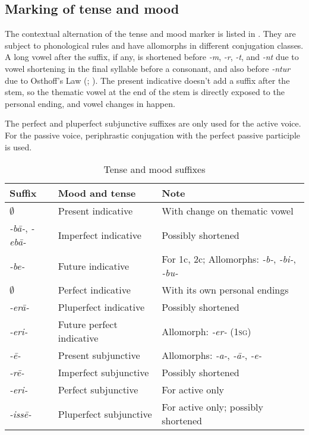 \documentclass[a4paper, oneside, 12pt]{report}
\newcommand*{\citepage}[1]{p.~{#1}}
\newcommand{\form}[1]{\emph{#1}}
\newcommand*{\category}[1]{\textsc{#1}}
\begin{document}
\subsection{Marking of tense and mood}\label{sec:tense-mood-marking}

The contextual alternation of the tense and mood marker is listed in
.
They are subject to phonological rules 
and have allomorphs in different conjugation classes. 
A long vowel after the suffix,
if any, is shortened before \form{-m}, \form{-r}, \form{-t}, and \form{-nt}
due to vowel shortening in the final syllable before a consonant,
and also before \form{-ntur} due to Osthoff's Law 
(; 
\citealt[\citepage{130}]{oniga2014latin}).
The present indicative doesn't add a suffix after the stem, 
so the thematic vowel at the end of the stem 
is directly exposed to the personal ending,
and vowel changes in  happen.

The perfect and pluperfect subjunctive suffixes 
are only used for the active voice.
For the passive voice,
periphrastic conjugation with the perfect passive participle is used.

\begin{table}[H]
    \caption{Tense and mood suffixes}
    \label{tbl:tense-suffix}
    \centering
    \begin{tabular}{lll}
        \toprule
        Suffix & Mood and tense & Note \\
        \midrule
        $\emptyset$         & Present indicative        & With change on thematic vowel\\
        \form{-b\={a}-}, \form{-eb\={a}-}    & Imperfect indicative      & Possibly shortened \\
        \form{-be-}         & Future indicative         & For 1c, 2c; 
        Allomorphs: \form{-b-}, \form{-bi-}, \form{-bu-} \\
        \midrule
        $\emptyset$         & Perfect indicative        & With its own personal endings \\ 
        \form{-er\={a}-}    & Pluperfect indicative     & Possibly shortened \\
        \form{-eri-}        & Future perfect indicative & Allomorph: \form{-er-} (\category{1sg}) \\ 
        \midrule
        \form{-\={e}-}      & Present subjunctive       & Allomorphs: \form{-a-}, \form{-\={a}-},
        \form{-e-} \\ 
        \form{-r\={e}-}     & Imperfect subjunctive     & Possibly shortened \\
        \midrule
        \form{-eri-}        & Perfect subjunctive       & For active only \\
        \form{-iss\={e}-}   & Pluperfect subjunctive    & For active only; possibly shortened  \\ \bottomrule
        \end{tabular}
\end{table}
\end{document}

